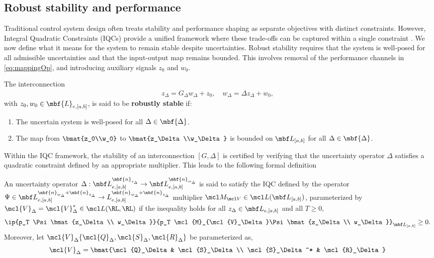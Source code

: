 \subsection{Robust stability and performance}
Traditional control system design often treats stability and performance shaping as separate objectives with distinct constraints. However, Integral Quadratic Constraints (IQCs) provide a unified framework where these trade-offs can be captured within a single constraint \cite{10156335}. We now define what it means for the system to remain stable despite uncertainties. Robust stability requires that the system is well-posed for all admissible uncertainties and that the input-output map remains bounded. This involves removal of the performance channels in \eqref{eq:mappingOp}, and introducing auxiliary signals $z_0$ and $w_0$.
\begin{definition}
	The interconnection
	\begin{align*}
		z_\Delta = G_\Delta w_\Delta + z_0, \quad
		w_\Delta = \Delta z_\Delta + w_0,
	\end{align*}
	with $z_0, w_0 \in \mbf{L}_{e,[a,b]}$, is said to be \textbf{robustly stable} if:
	\begin{enumerate}
		\item The uncertain system is well-posed for all $\Delta\in\mbf{\Delta}$.
		\item The map from $\bmat{z_0\\w_0}$ to $\bmat{z_\Delta\\w_\Delta}$ is bounded on $\mbf L_{[a,b]}$ for all $\Delta\in\mbf{\Delta}$.
	\end{enumerate}
\end{definition}
Within the IQC framework, the stability of an interconnection $[G,\Delta]$ is certified by verifying that the uncertainty operator $\Delta$ satisfies a quadratic constraint defined by an appropriate multiplier. This leads to the following formal definition
\begin{definition}\label{def:multipliers}
	An uncertainty operator $\Delta: \mbf L_{e,[a,b]}^{\mbf{n}_{z_\Delta}} \to \mbf L_{e,[a,b]}^{\mbf{n}_{w_\Delta}}$ is said to satisfy the IQC  defined by the operator $\Psi \in\mbf L^{\mbf{n}_{w_\Delta} + \mbf{n}_{z_\Delta}}_{e, [a, b]} \to L^{\mbf{n}_{w_\Delta} + \mbf{n}_{z_\Delta}}_{e, [a, b]}$ multiplier $\mcl M_{\mcl V}\in \mcl L(\mbf L_{[a, b]})$, parameterized by $\mcl{V}_\Delta = \mcl{V}_\Delta^* \in \mcl L(\RL, \RL)$ if the inequality holds for all $z_\Delta \in \mbf L_{e, [a, b]}$ and all $T \geq 0$,
	\begin{equation}\label{eqn:unciqc}
		\ip{p_T \Psi \bmat{z_\Delta \\ w_\Delta}}{p_T \mcl{M}_{\mcl{V}_\Delta}\Psi\bmat{z_\Delta \\ w_\Delta}}_{\mbf L_{[a, b]}} \geq 0.
	\end{equation}
	Moreover, let $\mcl{V}_\Delta\{\mcl{Q}_\Delta, \mcl{S}_\Delta, \mcl{R}_\Delta\}$ be parameterized as,
	\begin{equation*}
		\mcl{V}_\Delta = \bmat{\mcl{Q}_\Delta & \mcl{S}_\Delta \\ \mcl{S}_\Delta^* & \mcl{R}_\Delta}
	\end{equation*}
\end{definition}
